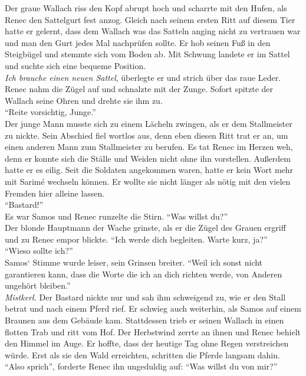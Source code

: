 Der graue Wallach riss den Kopf abrupt hoch und scharrte mit den Hufen, als Renec den Sattelgurt 
fest anzog. Gleich nach seinem ersten Ritt auf diesem Tier hatte er gelernt, dass dem Wallach was 
das Satteln anging nicht zu vertrauen war und man den Gurt jedes Mal nachprüfen sollte. Er hob 
seinen Fuß in den Steigbügel und stemmte sich vom Boden ab. Mit Schwung landete er im Sattel und 
suchte sich eine bequeme Position. \\
\textit{Ich brauche einen neuen Sattel}, überlegte er und strich über das raue Leder.\\
Renec nahm die Zügel auf und schnalzte mit der Zunge. Sofort spitzte der Wallach seine Ohren und 
drehte sie ihm zu.\\
``Reite vorsichtig, Junge.''\\
Der junge Mann musste sich zu einem Lächeln zwingen, als er dem Stallmeister zu nickte. Sein 
Abschied fiel wortlos aus, denn eben diesen Ritt trat er an, um einen anderen Mann zum Stallmeister 
zu berufen. Es tat Renec im Herzen weh, denn er konnte sich die Ställe und Weiden nicht ohne ihn 
vorstellen. Außerdem hatte er es eilig. Seit die Soldaten angekommen waren, hatte er kein Wort 
mehr mit Sarimé wechseln können. Er wollte sie nicht länger als nötig mit den vielen 
Fremden hier alleine lassen.\\
``Bastard!''\\
Es war Samos und Renec runzelte die Stirn. ``Was willst du?''\\
Der blonde Hauptmann der Wache grinste, als er die Zügel des Grauen ergriff und zu Renec empor 
blickte. ``Ich werde dich begleiten. Warte kurz, ja?''\\
``Wieso sollte ich?''\\
Samos‘ Stimme wurde leiser, sein Grinsen breiter. ``Weil ich sonst nicht garantieren kann, dass die 
Worte die ich an dich richten werde, von Anderen ungehört bleiben.''\\
\textit{Mistkerl.}
Der Bastard nickte nur und sah ihm schweigend zu, wie er den Stall betrat und nach einem Pferd 
rief. Er schwieg auch weiterhin, als Samos auf einem Braunen aus dem Gebäude kam. Stattdessen trieb 
er seinen Wallach in einen flotten Trab und ritt vom Hof. Der Herbstwind zerrte an ihnen und Renec 
behielt den Himmel im Auge. Er hoffte, dass der heutige Tag ohne Regen verstreichen würde. Erst als 
sie den Wald erreichten, schritten die Pferde langsam dahin.\\
``Also sprich'', forderte Renec ihn ungeduldig auf: ``Was willst du von mir?''\\
